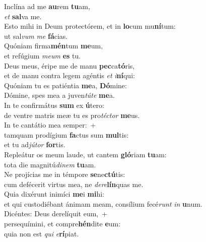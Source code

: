\evenverse Inclína ad me \textbf{au}rem \textbf{tu}am,~\*\\
\evenverse \textit{et} \textbf{sal}va me.\\
\oddverse Esto mihi in Deum protectórem, et in \textbf{lo}cum mu\textbf{ní}tum:~\*\\
\oddverse ut sal\textit{vum} \textit{me} \textbf{fá}cias.\\
\evenverse Quóniam firma\textbf{mén}tum \textbf{me}um,~\*\\
\evenverse et refúgium \textit{me}\textit{um} \textbf{es} tu.\\
\oddverse Deus meus, éripe me de manu \textbf{pec}ca\textbf{tó}ris,~\*\\
\oddverse et de manu contra legem agéntis \textit{et} \textit{i}\textbf{ní}qui:\\
\evenverse Quóniam tu es patiéntia \textbf{me}a, \textbf{Dó}mine:~\*\\
\evenverse Dómine, spes mea a juven\textit{tú}\textit{te} \textbf{me}a.\\
\oddverse In te confirmátus \textbf{sum} ex \textbf{ú}tero:~\*\\
\oddverse de ventre matris meæ tu es pro\textit{té}\textit{ctor} \textbf{me}us.\\
\evenverse In te cantátio mea semper:~+\\
\evenverse  tamquam prodígium \textbf{fa}ctus sum \textbf{mul}tis:~\*\\
\evenverse et tu ad\textit{jú}\textit{tor} \textbf{for}tis.\\
\oddverse Repleátur os meum laude, ut cantem \textbf{gló}riam \textbf{tu}am:~\*\\
\oddverse tota die magnitú\textit{di}\textit{nem} \textbf{tu}am.\\
\evenverse Ne projícias me in témpore \textbf{se}ne\textbf{ctú}tis:~\*\\
\evenverse cum defécerit virtus mea, ne \textit{de}\textit{re}\textbf{lín}quas me.\\
\oddverse Quia dixérunt inimíci \textbf{me}i \textbf{mi}hi:~\*\\
\oddverse et qui custodiébant ánimam meam, consílium fecé\textit{runt} \textit{in} \textbf{u}num.\\
\evenverse Dicéntes: Deus derelíquit eum,~+\\
\evenverse  persequímini, et compre\textbf{hén}dite \textbf{e}um:~\*\\
\evenverse quia non est \textit{qui} \textit{e}\textbf{rí}piat.\\
